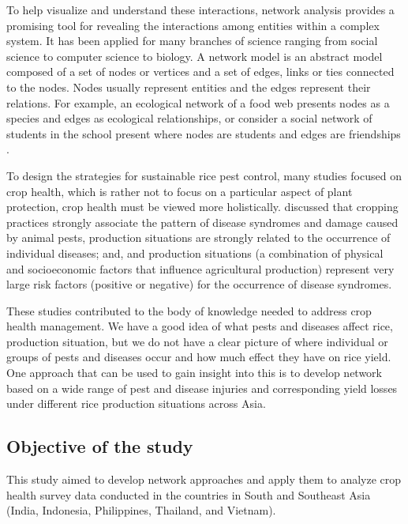 To help visualize and understand these interactions, network analysis provides a promising tool for revealing the interactions among entities within a complex system. It has been applied for many branches of science ranging from social science to computer science to biology. A network model is an abstract model composed of a set of nodes or vertices and a set of edges, links or ties connected to the nodes. Nodes usually represent entities and the edges represent their relations. For example, an ecological network of a food web presents nodes as a species \citep{Krause_2003_Compartments} and edges as ecological relationships, or consider a social network of students in the school present where nodes are students and edges are friendships \citep{Moody_2001_Race}.

To design the strategies for sustainable  rice pest control, many studies focused on crop health, which is rather not to focus on a particular aspect of plant protection, crop health must be viewed more holistically. \citet{Savary_1995_Use,Savary_2000_Quantification,Savary_2005_Multiple} discussed that cropping practices strongly associate the pattern of disease syndromes and damage caused by animal pests, production situations are strongly related to the occurrence of  individual diseases; and, and production situations (a combination of physical and socioeconomic factors that influence agricultural production) represent very large risk factors (positive or negative) for the occurrence of disease syndromes. 

These studies contributed to the body of knowledge needed to address crop health management. We have a good idea of what pests and diseases affect rice, production situation, but we do not have a clear picture of where individual or groups of pests and diseases occur and how much effect they have on rice yield. One approach that can be used to gain insight into this is to develop network based on a wide range of pest and disease injuries and corresponding yield losses under different rice production situations across Asia. 

\subsection{Objective of the study}
This study aimed to develop network approaches and apply them to analyze crop health survey data conducted in the countries in South and Southeast Asia (India, Indonesia, Philippines, Thailand, and Vietnam). 

